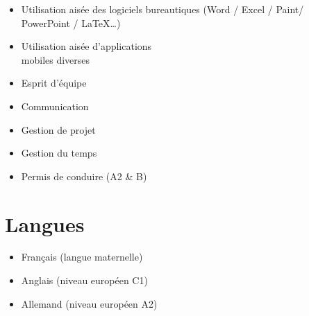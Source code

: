 \documentclass[9pt, oneside, a4paper, titlepage]{extarticle}
\begin{document}
\begin{tcolorbox}
\begin{minipage}[t]{6.2cm}
\begin{spacing}{0.95}
\begin{tcolorbox}[grow to left by = 0.6cm, colback = gray!25, colframe = white]
                \begin{itemize}
                    \vspace*{0.2cm}
                    \item Utilisation aisée des logiciels bureautiques (Word / Excel / Paint/ \\PowerPoint / \LaTeX \ldots)
                    \vspace*{0.2cm}
                    \item Utilisation aisée d’applications \\mobiles diverses
                    \vspace*{0.2cm}
                    \item Esprit d'équipe                    
                    \vspace*{0.2cm}
                    \item Communication
                    \vspace*{0.2cm}
                    \item Gestion de projet
                    \vspace*{0.2cm}
                    \item Gestion du temps
                    \vspace*{0.2cm}
                    \item Permis de conduire (A2 \& B)
                \end{itemize}


                \vspace*{0.2cm}
                
                \section*{Langues}
                \begin{itemize}
                    \item Français (langue maternelle)
                    \item Anglais (niveau européen C1)
                    \item Allemand (niveau européen A2)
                \end{itemize}
                \vspace*{0.5cm}

            \end{tcolorbox}
        \end{spacing}
        \end{minipage}
        \hspace*{0.4mm}
        \begin{minipage}[t]{12.8cm}
            \vspace*{-0.5cm}
            \begin{tcolorbox}[grow to right by = 0.6cm, colback = gray!25, colframe = white]

\end{tcolorbox}
\end{minipage}
\end{tcolorbox}
\end{document}
